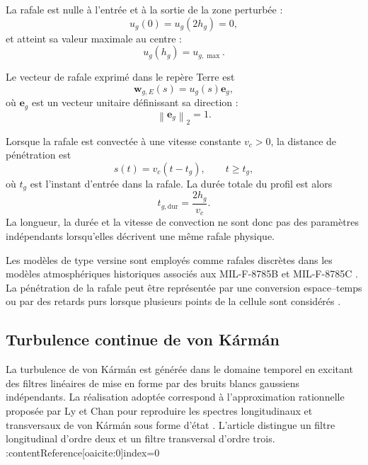 \documentclass[11pt,a4paper,oneside]{report}
\newcommand{\vect}[1]{\bm{#1}}
\newcommand{\norm}[1]{\left\lVert#1\right\rVert}
\begin{document}
	La rafale est nulle à l'entrée et à la sortie de la zone perturbée :
	\begin{equation}
		u_g(0)=u_g(2h_g)=0,
	\end{equation}
	et atteint sa valeur maximale au centre :
	\begin{equation}
		u_g(h_g)=u_{g,\max}.
	\end{equation}
	
	Le vecteur de rafale exprimé dans le repère Terre est
	\begin{equation}
		\vect w_{g,E}(s)
		=
		u_g(s)\vect e_g,
		\label{eq_gust_vector}
	\end{equation}
	où $\vect e_g$ est un vecteur unitaire définissant sa direction :
	\begin{equation}
		\norm{\vect e_g}_2=1.
	\end{equation}
	
	Lorsque la rafale est convectée à une vitesse constante $v_c>0$, la distance de pénétration est
	\begin{equation}
		s(t)
		=
		v_c\left(t-t_g\right),
		\qquad
		t\geq t_g,
		\label{eq_gust_penetration_distance}
	\end{equation}
	où $t_g$ est l'instant d'entrée dans la rafale. La durée totale du profil est alors
	\begin{equation}
		t_{g,\mathrm{dur}}
		=
		\frac{2h_g}{v_c}.
		\label{eq_gust_duration}
	\end{equation}
	La longueur, la durée et la vitesse de convection ne sont donc pas des paramètres indépendants lorsqu'elles décrivent une même rafale physique.
	
	Les modèles de type versine sont employés comme rafales discrètes dans les modèles atmosphériques historiques associés aux MIL-F-8785B et MIL-F-8785C \cite{MILF8785C,MILHDBK1797}. La pénétration de la rafale peut être représentée par une conversion espace--temps ou par des retards purs lorsque plusieurs points de la cellule sont considérés \cite{LyChan1980}.
	
\subsection{Turbulence continue de von Kármán}

La turbulence de von Kármán est générée dans le domaine temporel en excitant des filtres linéaires de mise en forme par des bruits blancs gaussiens indépendants. La réalisation adoptée correspond à l'approximation rationnelle proposée par Ly et Chan pour reproduire les spectres longitudinaux et transversaux de von Kármán sous forme d'état \cite{LyChan1980}. L'article distingue un filtre longitudinal d'ordre deux et un filtre transversal d'ordre trois. :contentReference[oaicite:0]{index=0}
\end{document}
